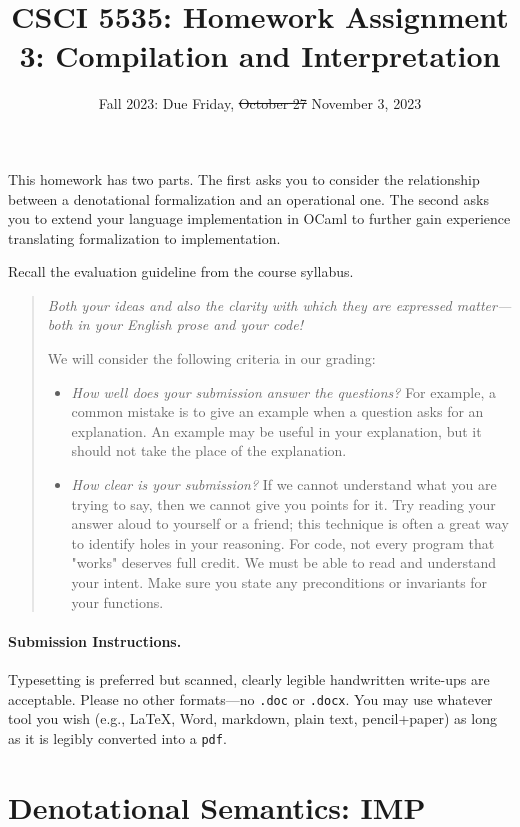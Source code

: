 \documentclass[12pt]{exam}
\title{CSCI 5535: Homework Assignment 3: Compilation and Interpretation}
\date{Fall 2023: Due Friday, \sout{October 27} November 3, 2023}
\author{}
\newcommand{\IMP}{\textbf{\textsf{IMP}}\xspace}
\begin{document}
\maketitle

This homework has two parts.
%
The first asks you to consider the relationship between a denotational formalization and an operational one.
%
The second asks you to extend your language implementation in OCaml to further gain experience translating formalization to implementation.

Recall the evaluation guideline from the course syllabus.
\begin{quote}\em
  Both your ideas and also the clarity with which they are expressed
  matter---both in your English prose and your code!

  We will consider the following criteria in our grading: 
  \begin{itemize}
    \item \emph{How well does your submission answer the questions?}
      For example, a common mistake is to give an example when a question
      asks for an explanation.  An example may be useful in your
      explanation, but it should not take the place of the explanation.
    \item \emph{How clear is your submission?}  If we cannot
      understand what you are trying to say, then we cannot give you
      points for it.  Try reading your answer aloud to yourself or a
      friend; this technique is often a great way to identify holes in
      your reasoning.  For code, not every program that "works"
      deserves full credit. We must be able to read and understand
      your intent.  Make sure you state any preconditions or
      invariants for your functions.
  \end{itemize}
\end{quote}

\paragraph{Submission Instructions.}

Typesetting is preferred but scanned, clearly legible handwritten write-ups are acceptable. Please no other formats---no
\texttt{.doc} or \texttt{.docx}. You may use whatever tool you wish (e.g., \LaTeX, Word, markdown, plain text, pencil+paper) as long as it is legibly
converted into a \texttt{pdf}.

\section{Denotational Semantics: \IMP}
\end{document}
